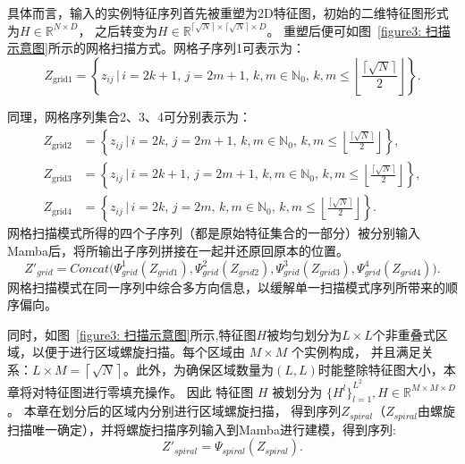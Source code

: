 具体而言，输入的实例特征序列首先被重塑为2D特征图，初始的二维特征图形式为$H\in \mathbb{R} ^{N\times D}$，
之后转变为$ H \in \mathbb{R} ^{\lceil\sqrt{N}\rceil \times \lceil\sqrt{N}\rceil \times D}$。
重塑后便可如图~\ref{figure3: 扫描示意图}所示的网格扫描方式。网格子序列1可表示为：
\begin{equation}
  Z_{\text{grid1}} = \left\{ z_{ij} \,\big|\, 
i = 2k + 1,\, j = 2m + 1,\, 
k, m \in \mathbb{N}_0,\, 
k, m \leq \left\lfloor \frac{\lceil \sqrt{N} \rceil}{2} \right\rfloor 
\right\}.
\label{Z_grid1}
\end{equation}

同理，网格序列集合2、3、4可分别表示为：
\begin{equation}
  \begin{aligned}
  Z_{\text{grid2}} &= \left\{ z_{ij} \,\big|\, 
  i = 2k,\, j = 2m + 1,\, 
  k, m \in \mathbb{N}_0,\, 
  k, m \leq \left\lfloor \frac{\lceil \sqrt{N} \rceil}{2} \right\rfloor 
  \right\}, \\
  Z_{\text{grid3}} &= \left\{ z_{ij} \,\big|\, 
  i = 2k + 1,\, j = 2m + 1,\, 
  k, m \in \mathbb{N}_0,\, 
  k, m \leq \left\lfloor \frac{\lceil \sqrt{N} \rceil}{2} \right\rfloor 
  \right\}, \\
  Z_{\text{grid4}} &= \left\{ z_{ij} \,\big|\, 
  i = 2k,\, j = 2m,\, 
  k, m \in \mathbb{N}_0,\, 
  k, m \leq \left\lfloor \frac{\lceil \sqrt{N} \rceil}{2} \right\rfloor 
  \right\}.
  \end{aligned}
  \label{Z_grid234}
\end{equation}
网格扫描模式所得的四个子序列（都是原始特征集合的一部分）被分别输入Mamba后，将所输出子序列拼接在一起并还原回原本的位置。
\begin{equation}
  Z'_{grid}=Concat({\Psi^1_{grid} (Z_{grid1})},{\Psi^2_{grid} (Z_{grid2})},{\Psi^3_{grid} (Z_{grid3})},{\Psi^4_{grid} (Z_{grid4}))}.
\end{equation}
网格扫描模式在同一序列中综合多方向信息，以缓解单一扫描模式序列所带来的顺序偏向。

同时，如图~\ref{figure3: 扫描示意图}所示,特征图$H$被均匀划分为$L\times L$个非重叠式区域，以便于进行区域螺旋扫描。每个区域由 $M\times M$ 个实例构成，
并且满足关系：$L \times M=\left\lceil\sqrt{N}\right\rceil$。此外，为确保区域数量为$(L,L)$时能整除特征图大小，本章将对特征图进行零填充操作。
因此 特征图 $H$ 被划分为 ${\{H^l\}}^{L^2}_{l=1},H \in \mathbb{R} ^{M\times M\times D}$。
本章在划分后的区域内分别进行区域螺旋扫描，
得到序列$Z_{spiral}$（$Z_{spiral}$由螺旋扫描唯一确定），并将螺旋扫描序列输入到Mamba进行建模，得到序列:
\begin{equation}
  Z'_{spiral}=\Psi_{spiral} (Z_{spiral}).
\end{equation}

